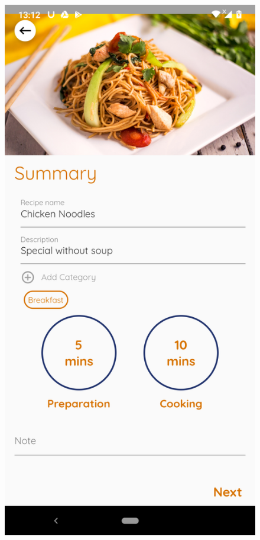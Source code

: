 \documentclass{article}
\begin{document}
        \begin{figure}[h!]
        \centering
        \includegraphics[scale=0.1]{Images/firednod_order.jpg}

\end{figure}
\end{document}
